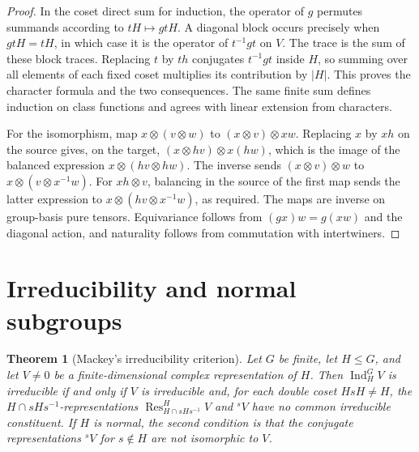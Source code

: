 \documentclass[11pt,oneside,openany]{book}
\newtheorem{theorem}{Theorem}[chapter]
\theoremstyle{definition}
\theoremstyle{remark}
\begin{document}
\begin{proof}
In the coset direct sum for induction, the operator of \(g\)
permutes summands according to \(tH\mapsto gtH\).
A diagonal block occurs precisely when \(gtH=tH\), in which
case it is the operator of \(t^{-1}gt\) on \(V\). The trace
is the sum of these block traces. Replacing \(t\) by \(th\)
conjugates \(t^{-1}gt\) inside \(H\), so summing over all
elements of each fixed coset multiplies its contribution
by \(|H|\). This proves the character formula and the two
consequences. The same finite sum defines induction on class
functions and agrees with linear extension from characters.

For the isomorphism, map
\(x\otimes(v\otimes w)\) to \((x\otimes v)\otimes xw\).
Replacing \(x\) by \(xh\) on the source gives, on the target,
\((x\otimes hv)\otimes x(hw)\), which is the image of the
balanced expression \(x\otimes(hv\otimes hw)\).
The inverse sends \((x\otimes v)\otimes w\) to
\(x\otimes(v\otimes x^{-1}w)\). For \(xh\otimes v\),
balancing in the source of the first map sends the latter
expression to
\(x\otimes(hv\otimes x^{-1}w)\), as required.
The maps are inverse on group-basis pure tensors. Equivariance
follows from \((gx)w=g(xw)\) and the diagonal action,
and naturality follows from commutation with intertwiners.
\end{proof}

\section{Irreducibility and normal subgroups}

\begin{theorem}[Mackey's irreducibility criterion]
\label{p103:ALG-07-C03-S03}
Let \(G\) be finite, let \(H\le G\), and let \(V\ne0\) be a
finite-dimensional complex representation of \(H\).
Then \(\operatorname{Ind}_H^G V\) is irreducible if and only if
\(V\) is irreducible and, for each double coset \(HsH\ne H\),
the \(H\cap sHs^{-1}\)-representations
\(\operatorname{Res}_{H\cap sHs^{-1}}^H V\) and \({}^s V\)
have no common irreducible constituent.
If \(H\) is normal, the second condition is that the conjugate
representations \({}^s V\) for \(s\notin H\) are not isomorphic to \(V\).
\end{theorem}
\end{document}

